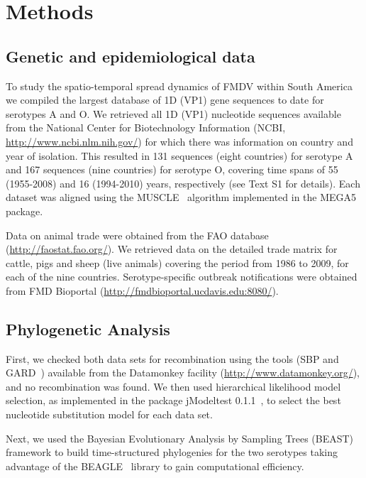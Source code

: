 \documentclass[10pt]{article}
\begin{document}
\section*{Methods}

\subsection*{Genetic and epidemiological data}

To study the spatio-temporal spread dynamics of FMDV within South America we compiled the largest database of 1D (VP1) gene sequences to date for serotypes A and O.
We retrieved all 1D (VP1) nucleotide sequences available from the National Center for Biotechnology Information (NCBI, \url{ http://www.ncbi.nlm.nih.gov/}) for which there was information on country and year of isolation.
This resulted in 131 sequences (eight countries) for serotype A and 167 sequences (nine countries) for serotype O, covering time spans of 55 (1955-2008) and 16 (1994-2010) years, respectively (see Text S1 for details).
Each dataset was aligned using the MUSCLE~\cite{muscle} algorithm implemented in the MEGA5~\cite{MEGA} package.

Data on animal trade were obtained from the FAO database (\url{http://faostat.fao.org/}).
We retrieved data on the detailed trade matrix for cattle, pigs and sheep (live animals) covering the period from 1986 to 2009, for each of the nine countries.
Serotype-specific outbreak notifications were obtained from FMD Bioportal (\url{http://fmdbioportal.ucdavis.edu:8080/}).

\subsection*{Phylogenetic Analysis}

First, we checked both data sets for recombination using the tools (SBP and GARD~\cite{sbpgard}) available from the Datamonkey facility (\url{http://www.datamonkey.org/}), and no recombination was found.
We then used hierarchical likelihood model selection, as implemented in the package jModeltest 0.1.1~\cite{jmodel}, to select the best nucleotide substitution model for each data set.

Next, we used the Bayesian Evolutionary Analysis by Sampling Trees (BEAST)~\cite{beast2012} framework to build time-structured phylogenies for the two serotypes taking advantage of the  BEAGLE~\cite{BEAGLE} library to gain computational efficiency.
\end{document}

